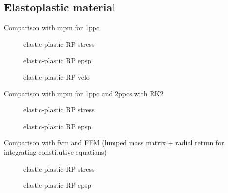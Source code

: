\subsection{Elastoplastic material}
Comparison with mpm for 1ppc
\begin{figure}[h!]
  \centering
  {}
  {}
  {}
  \caption{elastic-plastic RP stress}
  \label{fig:stress_elastoplastic_RP}
\end{figure}
\begin{figure}[h!]
  \centering
  {}
  {}
  {}
  \caption{elastic-plastic RP epsp}
  \label{fig:epsp_elastoplastic_RP}
\end{figure}
\begin{figure}[h!]
  \centering
  {}
  {}
  {}
  \caption{elastic-plastic RP velo}
  \label{fig:velo_elastoplastic_RP}
\end{figure}
Comparison with mpm for 1ppc and 2ppcs with RK2
\begin{figure}[h!]
  \centering
  {}
  {}
  {}
  \caption{elastic-plastic RP stress}
  \label{fig:stress_elastoplastic_RP}
\end{figure}
\begin{figure}[h!]
  \centering
  {}
  {}
  {}
  \caption{elastic-plastic RP epsp}
  \label{fig:epsp_elastoplastic_RP}
\end{figure}


Comparison with fvm and FEM (lumped mass matrix + radial return for integrating constitutive equations)
\begin{figure}[h!]
  \centering
  {}
  {}
  {}
  \caption{elastic-plastic RP stress}
  \label{fig:stress_elastoplastic_RP}
\end{figure}
\begin{figure}[h!]
  \centering
  {}
  {}
  {}
  \caption{elastic-plastic RP epsp}
  \label{fig:epsp_elastoplastic_RP}
\end{figure}


